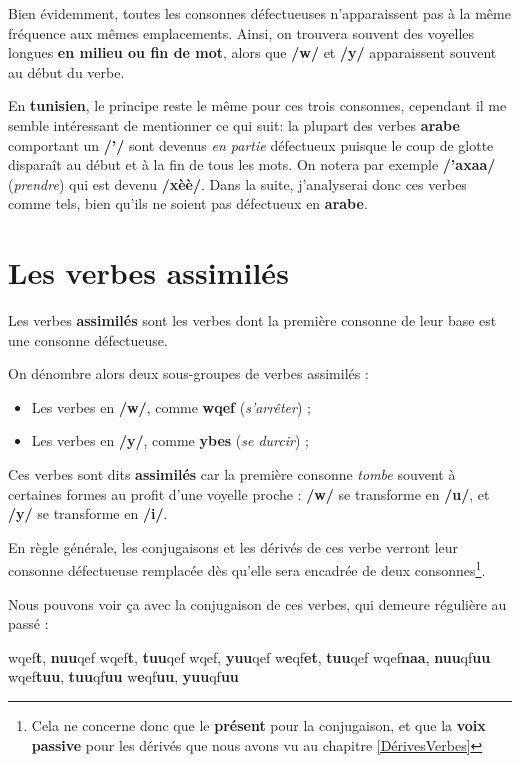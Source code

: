 Bien évidemment, toutes les consonnes défectueuses n'apparaissent pas à la même fréquence aux mêmes emplacements. Ainsi, on trouvera souvent des voyelles longues \textbf{en milieu ou fin de mot}, alors que \textbf{/w/} et \textbf{/y/} apparaissent souvent au début du verbe.

En \textbf{tunisien}, le principe reste le même pour ces trois consonnes, cependant il me semble intéressant de mentionner ce qui suit: la plupart des verbes \textbf{arabe} comportant un \textbf{/'/} sont devenus \textit{en partie} défectueux puisque le coup de glotte disparaît au début et à la fin de tous les mots. On notera par exemple \textbf{/'axa\dh a/}  (\textit{prendre}) qui est devenu \textbf{/x\dh èè/}. Dans la suite, j'analyserai donc ces verbes comme tels, bien qu'ils ne soient pas défectueux en \textbf{arabe}.

\section{Les verbes assimilés}
Les verbes \textbf{assimilés} sont les verbes dont la première consonne de leur base est une consonne défectueuse.

On dénombre alors deux sous-groupes de verbes assimilés : 
\begin{itemize}
    \item Les verbes en \textbf{/w/}, comme \textbf{wqef} (\textit{s'arrêter}) ;
    \item Les verbes en \textbf{/y/}, comme \textbf{ybes} (\textit{se durcir}) ;
\end{itemize}

Ces verbes sont dits \textbf{assimilés} car la première consonne \textit{tombe} souvent à certaines formes au profit d'une voyelle proche : \textbf{/w/} se transforme en \textbf{/u/}, et \textbf{/y/} se transforme en \textbf{/i/}.

En règle générale, les conjugaisons et les dérivés de ces verbe verront leur consonne défectueuse remplacée dès qu'elle sera encadrée de deux consonnes\footnote{Cela ne concerne donc que le \textbf{présent} pour la conjugaison, et que la \textbf{voix passive} pour les dérivés que nous avons vu au chapitre \ref{DérivesVerbes}}.

Nous pouvons voir ça avec la conjugaison de ces verbes, qui demeure régulière au passé : 

    {wqef\textbf{t}, \textbf{nuu}qef}
    {wqef\textbf{t}, \textbf{tuu}qef}
    {wqef, \textbf{yuu}qef}
    {w\textbf{e}qf\textbf{et}, \textbf{tuu}qef}
    {wqef\textbf{naa}, \textbf{nuu}qf\textbf{uu}}
    {wqef\textbf{tuu}, \textbf{tuu}qf\textbf{uu}}
    {w\textbf{e}qf\textbf{uu}, \textbf{yuu}qf\textbf{uu}}

